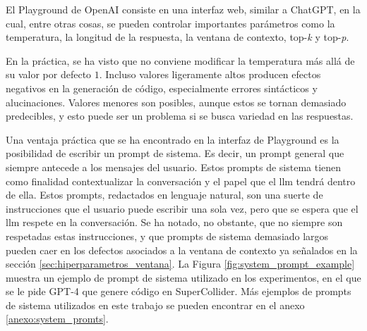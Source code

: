 El Playground de OpenAI consiste en una interfaz web, similar a ChatGPT, en la cual, entre otras cosas, se pueden controlar importantes parámetros como la temperatura, la longitud de la respuesta, la ventana de contexto, top-\emph{k} y top-\emph{p}. 

En la práctica, se ha visto que no conviene modificar la temperatura más allá de su valor por defecto $1$. Incluso valores ligeramente altos producen efectos negativos en la generación de código, especialmente errores sintácticos y alucinaciones. Valores menores son posibles, aunque estos se tornan demasiado predecibles, y esto puede ser un problema si se busca variedad en las respuestas.

Una ventaja práctica que se ha encontrado en la interfaz de Playground es la posibilidad de escribir un prompt de sistema. Es decir, un prompt general que siempre antecede a los mensajes del usuario. Estos prompts de sistema tienen como finalidad contextualizar la conversación y el papel que el \gls{llm} tendrá dentro de ella. Estos prompts, redactados en lenguaje natural, son una suerte de instrucciones que el usuario puede escribir una sola vez, pero que se espera que el \gls{llm} respete en la conversación. Se ha notado, no obstante, que no siempre son respetadas estas instrucciones, y que prompts de sistema demasiado largos pueden caer en los defectos asociados a la ventana de contexto ya señalados en la sección \ref{sec:hiperparametros_ventana}. La Figura \ref{fig:system_prompt_example} muestra un ejemplo de prompt de sistema utilizado en los experimentos, en el que se le pide GPT-4 que genere código en SuperCollider. Más ejemplos de prompts de sistema utilizados en este trabajo se pueden encontrar en el anexo \ref{anexo:system_promts}.

